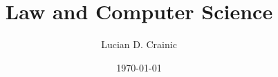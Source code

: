 \documentclass{article}
\title{Law and Computer Science}
\author{Lucian D. Crainic}
\date{\today}
\begin{document}
  \createintro

  

  \listnotes
\end{document}

